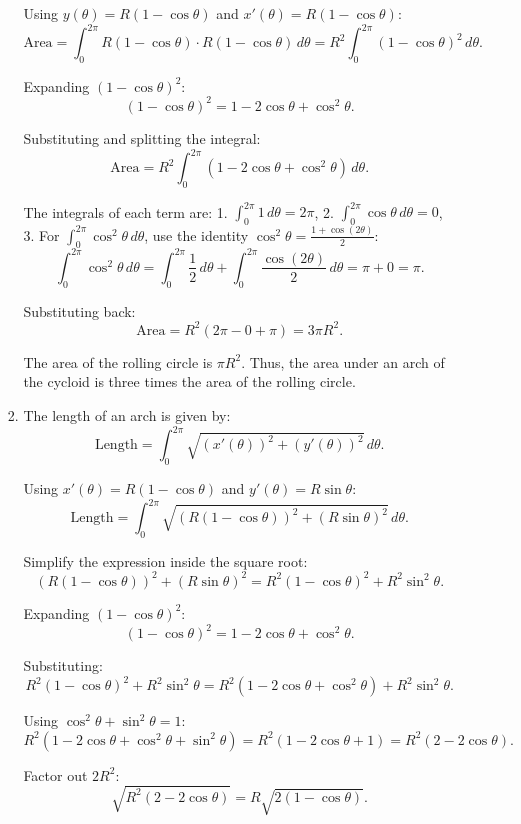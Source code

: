 \documentclass[12pt]{article}
\begin{document}
\begin{enumerate}
\begin{enumerate}
\begin{enumerate}
Using \( y(\theta) = R(1 - \cos\theta) \) and \( x'(\theta) = R(1 - \cos\theta) \):
\[
\text{Area} = \int_{0}^{2\pi} R(1 - \cos\theta) \cdot R(1 - \cos\theta) \, d\theta = R^2 \int_{0}^{2\pi} (1 - \cos\theta)^2 \, d\theta.
\]

Expanding \( (1 - \cos\theta)^2 \):
\[
(1 - \cos\theta)^2 = 1 - 2\cos\theta + \cos^2\theta.
\]

Substituting and splitting the integral:
\[
\text{Area} = R^2 \int_{0}^{2\pi} (1 - 2\cos\theta + \cos^2\theta) \, d\theta.
\]

The integrals of each term are:
1. \( \int_{0}^{2\pi} 1 \, d\theta = 2\pi \),
2. \( \int_{0}^{2\pi} \cos\theta \, d\theta = 0 \),
3. For \( \int_{0}^{2\pi} \cos^2\theta \, d\theta \), use the identity \( \cos^2\theta = \frac{1 + \cos(2\theta)}{2} \):
   \[
   \int_{0}^{2\pi} \cos^2\theta \, d\theta = \int_{0}^{2\pi} \frac{1}{2} \, d\theta + \int_{0}^{2\pi} \frac{\cos(2\theta)}{2} \, d\theta = \pi + 0 = \pi.
   \]

Substituting back:
\[
\text{Area} = R^2 (2\pi - 0 + \pi) = 3\pi R^2.
\]

The area of the rolling circle is \( \pi R^2 \). Thus, the area under an arch of the cycloid is three times the area of the rolling circle.

\item 

The length of an arch is given by:
\[
\text{Length} = \int_{0}^{2\pi} \sqrt{\left( x'(\theta) \right)^2 + \left( y'(\theta) \right)^2} \, d\theta.
\]

Using \( x'(\theta) = R(1 - \cos\theta) \) and \( y'(\theta) = R\sin\theta \):
\[
\text{Length} = \int_{0}^{2\pi} \sqrt{\left(R(1 - \cos\theta)\right)^2 + \left(R\sin\theta\right)^2} \, d\theta.
\]

Simplify the expression inside the square root:
\[
\left(R(1 - \cos\theta)\right)^2 + \left(R\sin\theta\right)^2 = R^2(1 - \cos\theta)^2 + R^2\sin^2\theta.
\]

Expanding \( (1 - \cos\theta)^2 \):
\[
(1 - \cos\theta)^2 = 1 - 2\cos\theta + \cos^2\theta.
\]

Substituting:
\[
R^2(1 - \cos\theta)^2 + R^2\sin^2\theta = R^2(1 - 2\cos\theta + \cos^2\theta) + R^2\sin^2\theta.
\]

Using \( \cos^2\theta + \sin^2\theta = 1 \):
\[
R^2(1 - 2\cos\theta + \cos^2\theta + \sin^2\theta) = R^2(1 - 2\cos\theta + 1) = R^2(2 - 2\cos\theta).
\]

Factor out \( 2R^2 \):
\[
\sqrt{R^2(2 - 2\cos\theta)} = R\sqrt{2(1 - \cos\theta)}.
\]


\end{enumerate}
\end{enumerate}
\end{enumerate}
\end{document}
